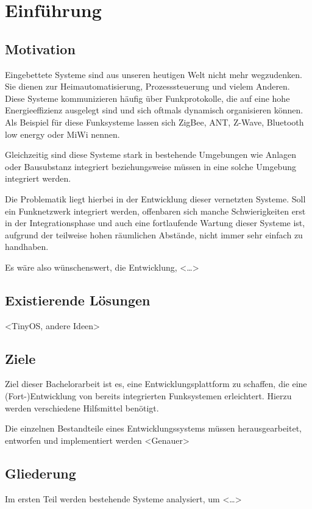 \chapter{Einführung}
\adjustmtc
\minitoc
\section{Motivation}
Eingebettete Systeme sind aus unseren heutigen Welt nicht mehr wegzudenken. Sie
dienen zur Heimautomatisierung, Prozesssteuerung und vielem
Anderen. Diese Systeme kommunizieren
häufig über Funkprotokolle, die auf eine hohe Energieeffizienz ausgelegt sind
und sich oftmals dynamisch organisieren können. Als Beispiel für diese
Funksysteme lassen sich ZigBee, ANT, Z-Wave, Bluetooth low energy oder MiWi
nennen.

Gleichzeitig sind diese Systeme stark in bestehende Umgebungen wie Anlagen oder
Bausubstanz integriert beziehungsweise müssen in eine solche Umgebung
integriert werden.

Die Problematik liegt hierbei in der Entwicklung dieser vernetzten Systeme. Soll
ein Funknetzwerk integriert werden, offenbaren sich manche Schwierigkeiten erst
in der Integrationsphase und auch eine fortlaufende Wartung dieser Systeme ist,
aufgrund der teilweise hohen räumlichen Abstände, nicht immer sehr einfach zu
handhaben.

Es wäre also wünschenswert, die Entwicklung,  <\ldots>
\section{Existierende Lösungen}
<TinyOS, andere Ideen>
\section{Ziele}
Ziel dieser Bachelorarbeit ist es, eine Entwicklungsplattform zu schaffen, die
eine\\ (Fort-)Entwicklung von bereits integrierten Funksystemen
erleichtert.
Hierzu werden verschiedene Hilfsmittel benötigt.

Die einzelnen Bestandteile eines Entwicklungssystems müssen herausgearbeitet,
entworfen und implementiert werden
<Genauer>
\section{Gliederung}
Im ersten Teil werden bestehende Systeme analysiert, um <\ldots>
